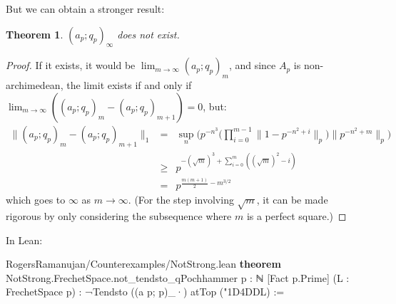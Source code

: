 \documentclass[12pt]{amsart}
\newtheorem{theorem}{Theorem}[subsection]
\theoremstyle{definition}
\theoremstyle{remark}
\numberwithin{equation}{subsection}
\newcommand{\nhds}{{\char"1D4DD}}
\newcommand{\kw}[1]{\textcolor{keywordcolor}{\textbf{#1}}}
\newcommand{\var}[1]{\textcolor{tacticcolor}{#1}}
\newcommand{\prop}[1]{\textcolor{sortcolor}{#1}}
\newcommand{\imp}[1]{\textcolor{commentcolor}{\textbraceleft#1\textbraceright}}
\begin{document}
But we can obtain a stronger result:
\begin{theorem}\label{thm:no-poch-inf}
    $(a_p; q_p)_\infty$ does not exist.
\end{theorem}
\begin{proof}
    If it exists, it would be $\lim_{m \to \infty} (a_p; q_p)_m$, and since $A_p$ is non-archimedean, the limit exists if and only if $\lim_{m \to \infty} \left( (a_p; q_p)_m - (a_p; q_p)_{m+1} \right) = 0$, but:
\[
\begin{array}{rcl}
    \| (a_p; q_p)_m - (a_p; q_p)_{m+1} \|_1
    &=& \sup_n \Big( p^{-n^3} \Big( \prod_{i=0}^{m-1} \| 1 - p^{-n^2+i} \|_p \Big) \| p^{-n^2+m} \|_p \Big) \\
    &\ge& p^{-(\sqrt{m})^3 + \sum_{i=0}^{m} ((\sqrt{m})^2-i)} \\
    &=& p^{\frac{m(m+1)}{2} - m^{3/2}}
\end{array}
\]
    which goes to $\infty$ as $m \to \infty$. (For the step involving $\sqrt{m}$, it can be made rigorous by only considering the subsequence where $m$ is a perfect square.)
\end{proof}

In Lean:

\begin{code}{RogersRamanujan/Counterexamples/NotStrong.lean}
\kw{theorem} NotStrong.FrechetSpace.not_tendsto_qPochhammer \imp{p : ℕ} [Fact \var{p}.\prop{Prime}]
  (\var{L} : FrechetSpace \var{p}) : ¬Tendsto ((a \var{p}; \var{p})_·) atTop (\nhds \var{L}) :=
\end{code}
\end{document}
